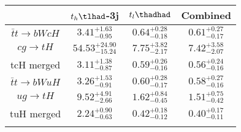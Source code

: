 \begin{tabular}{cccc} \toprule\toprule
 & $t_h\tlhad$-3j & $t_l\thadhad$ & Combined\\\midrule
$\bar{t}t\to bWcH$ & $3.41^{+1.63}_{-0.95}$ & $0.64^{+0.28}_{-0.18}$ & $0.61^{+0.27}_{-0.17}$\\
$cg\to tH$ & $54.53^{+24.90}_{-15.24}$ & $7.75^{+3.82}_{-2.17}$ & $7.42^{+3.58}_{-2.07}$\\
tcH merged & $3.11^{+1.38}_{-0.87}$ & $0.59^{+0.26}_{-0.16}$ & $0.56^{+0.24}_{-0.16}$\\
$\bar{t}t\to bWuH$ & $3.26^{+1.53}_{-0.91}$ & $0.60^{+0.28}_{-0.17}$ & $0.58^{+0.27}_{-0.16}$\\
$ug\to tH$ & $9.52^{+4.91}_{-2.66}$ & $1.62^{+0.84}_{-0.45}$ & $1.51^{+0.75}_{-0.42}$\\
tuH merged & $2.24^{+0.90}_{-0.63}$ & $0.42^{+0.18}_{-0.12}$ & $0.40^{+0.17}_{-0.11}$\\
\bottomrule\bottomrule\\
\end{tabular}